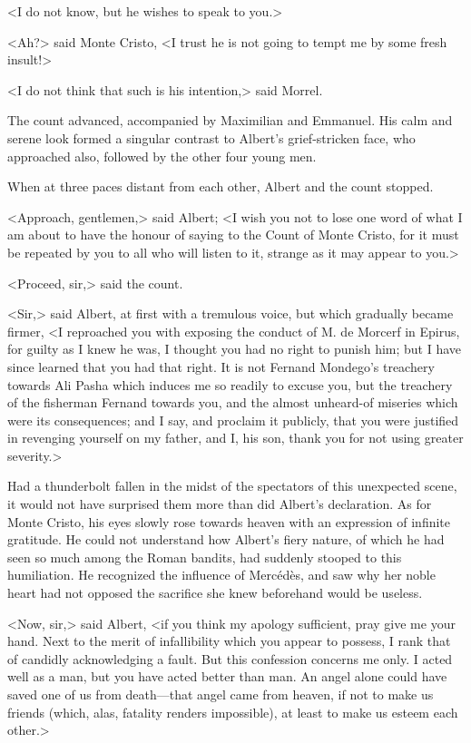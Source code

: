  <I do not know, but he wishes to speak to you.> 

 <Ah?> said Monte Cristo, <I trust he is not going to tempt me by some fresh insult!> 

 <I do not think that such is his intention,> said Morrel. 

 The count advanced, accompanied by Maximilian and Emmanuel. His calm and serene look formed a singular contrast to Albert's grief-stricken face, who approached also, followed by the other four young men. 

 When at three paces distant from each other, Albert and the count stopped. 

 <Approach, gentlemen,> said Albert; <I wish you not to lose one word of what I am about to have the honour of saying to the Count of Monte Cristo, for it must be repeated by you to all who will listen to it, strange as it may appear to you.> 

 <Proceed, sir,> said the count. 

 <Sir,> said Albert, at first with a tremulous voice, but which gradually became firmer, <I reproached you with exposing the conduct of M. de Morcerf in Epirus, for guilty as I knew he was, I thought you had no right to punish him; but I have since learned that you had that right. It is not Fernand Mondego's treachery towards Ali Pasha which induces me so readily to excuse you, but the treachery of the fisherman Fernand towards you, and the almost unheard-of miseries which were its consequences; and I say, and proclaim it publicly, that you were justified in revenging yourself on my father, and I, his son, thank you for not using greater severity.> 

 Had a thunderbolt fallen in the midst of the spectators of this unexpected scene, it would not have surprised them more than did Albert's declaration. As for Monte Cristo, his eyes slowly rose towards heaven with an expression of infinite gratitude. He could not understand how Albert's fiery nature, of which he had seen so much among the Roman bandits, had suddenly stooped to this humiliation. He recognized the influence of Mercédès, and saw why her noble heart had not opposed the sacrifice she knew beforehand would be useless. 

 <Now, sir,> said Albert, <if you think my apology sufficient, pray give me your hand. Next to the merit of infallibility which you appear to possess, I rank that of candidly acknowledging a fault. But this confession concerns me only. I acted well as a man, but you have acted better than man. An angel alone could have saved one of us from death—that angel came from heaven, if not to make us friends (which, alas, fatality renders impossible), at least to make us esteem each other.> 

